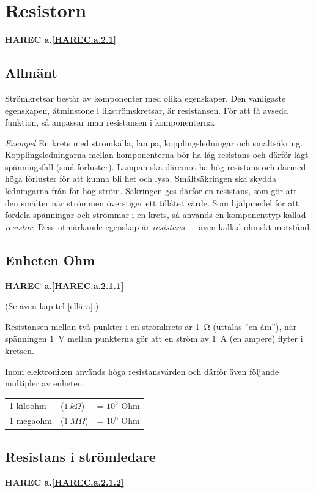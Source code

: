 \section{Resistorn}
 \textbf{HAREC a.\ref{HAREC.a.2.1}\label{myHAREC.a.2.1}}

\subsection{Allmänt}

Strömkretsar består av komponenter med olika egenskaper.
Den vanligaste egenskapen, åtminstone i likströmskretsar, är resistansen.
För att få avsedd funktion, så anpassar man resistansen i komponenterna.

\emph{Exempel}
En krets med strömkälla, lampa, kopplingsledningar och smältsäkring.
Kopplingsledningarna mellan komponenterna bör ha låg resistans och därför lågt
spänningsfall (små förluster). Lampan ska däremot ha hög resistans och därmed
höga förluster för att kunna bli het och lysa. Smältsäkringen ska skydda
ledningarna från för hög ström. Säkringen ges därför en resistans, som gör
att den smälter när strömmen överstiger ett tillåtet värde.
Som hjälpmedel för att fördela spänningar och strömmar i en krets, så används
en komponenttyp kallad \emph{resistor}. Dess utmärkande egenskap är
\emph{resistans} --- även kallad ohmskt motstånd.

\subsection{Enheten Ohm}
\textbf{HAREC a.\ref{HAREC.a.2.1.1}\label{myHAREC.a.2.1.1}}

(Se även kapitel \ref{ellära}.)

Resistansen mellan två punkter i en strömkrets är 1~Ω (uttalas
''en åm''), när spänningen 1~V mellan punkterna gör att en ström
av 1~A (en ampere) flyter i kretsen.

Inom elektroniken används höga resistansvärden och därför även följande
multipler av enheten
\begin{tabular}{lll}
  1 kiloohm & (\(1\ k\Omega\)) & = \(10^3\) Ohm \\
  1 megaohm & (\(1\ M\Omega\)) & = \(10^6\) Ohm \\
\end{tabular}

\subsection{Resistans i strömledare}
\textbf{HAREC a.\ref{HAREC.a.2.1.2}\label{myHAREC.a.2.1.2}}

